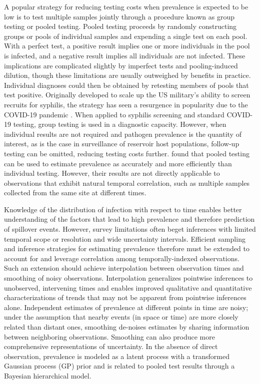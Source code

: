 \documentclass{article}
\begin{document}
A popular strategy for reducing testing costs when prevalence is expected to be low is to test multiple samples jointly through a procedure known as group testing or pooled testing. Pooled testing proceeds by randomly constructing groups or pools of individual samples and expending a single test on each pool. With a perfect test, a positive result implies one or more individuals in the pool is infected, and a negative result implies all individuals are not infected. These implications are complicated slightly by imperfect tests and pooling-induced dilution, though these limitations are usually outweighed by benefits in practice. Individual diagnoses could then be obtained by retesting members of pools that test positive. Originally developed to scale up the US military's ability to screen recruits for syphilis, the strategy has seen a resurgence in popularity due to the COVID-19 pandemic \cite{garg2021evaluation}. When applied to syphilis screening and standard COVID-19 testing, group testing is used in a diagnostic capacity. However, when individual results are not required and pathogen prevalence is the quantity of interest, as is the case in surveillance of reservoir host populations, follow-up testing can be omitted, reducing testing costs further. \cite{hoegh2021estimating} found that pooled testing can be used to estimate prevalence as accurately and more efficiently than individual testing. However, their results are not directly applicable to observations that exhibit natural temporal correlation, such as multiple samples collected from the same site at different times. 

Knowledge of the distribution of infection with respect to time enables better understanding of the factors that lead to high prevalence and therefore prediction of spillover events. However, survey limitations often beget inferences with limited temporal scope or resolution and wide uncertainty intervals. Efficient sampling and inference strategies for estimating prevalence therefore must be extended to account for and leverage correlation among temporally-indexed observations. Such an extension should achieve interpolation between observation times and smoothing of noisy observations. Interpolation generalizes pointwise inferences to unobserved, intervening times and enables improved qualitative and quantitative characterizations of trends that may not be apparent from pointwise inferences alone. Independent estimates of prevalence at different points in time are noisy; under the assumption that nearby events (in space or time) are more closely related than distant ones, smoothing de-noises estimates by sharing information between neighboring observations. Smoothing can also produce more comprehensive representations of uncertainty. In the absence of direct observation, prevalence is modeled as a latent process with a transformed Gaussian process (GP) prior and is related to pooled test results through a Bayesian hierarchical model. 
\end{document}
